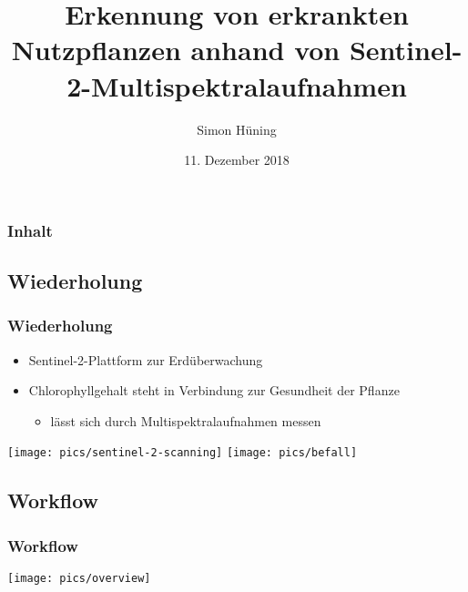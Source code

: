 \documentclass{beamer}
\title[Erkennung von erkrankten Nutzpflanzen]{Erkennung von erkrankten Nutzpflanzen anhand von Sentinel-2-Multispektralaufnahmen} %
\author{Simon Hüning} %
\institute[] %
{
Universität Leipzig \\ %
\medskip
}
\date{11. Dezember 2018} %
\begin{document}
\begin{frame}
\titlepage %
\end{frame}

\begin{frame}
\frametitle{Inhalt} %
\tableofcontents %
\end{frame}


\begin{frame}\section{Wiederholung}\frametitle{Wiederholung}
\begin{minipage}{0.5\textwidth}
	\begin{itemize}
		\item Sentinel-2-Plattform zur Erdüberwachung
		\item Chlorophyllgehalt steht in Verbindung zur Gesundheit der Pflanze
		\begin{itemize}
			\item lässt sich durch Multispektralaufnahmen messen
		\end{itemize} 
	\end{itemize}
\end{minipage}
\hspace{1em}
\begin{minipage}{0.4\textwidth}
	\texttt{[image: pics/sentinel-2-scanning]}
	\texttt{[image: pics/befall]}
\end{minipage}
\end{frame}


\begin{frame}\section{Workflow}\frametitle{Workflow}
\begin{minipage}{\textwidth}
	\center
	\texttt{[image: pics/overview]}
\end{minipage}
\end{frame}
\end{document}
